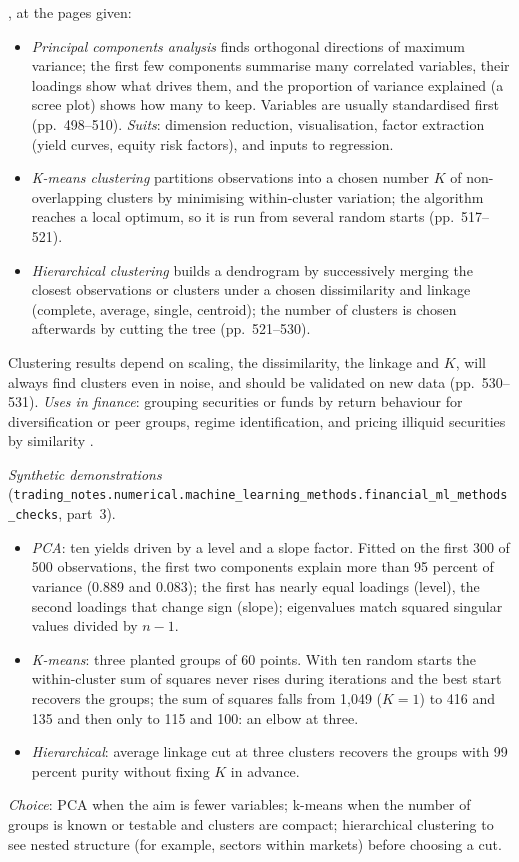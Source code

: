 \begin{qfmethod}\label{meth:unsupervised-algorithm-selection}
 \citep[pp.~498--531]{s6-isl}, at the pages given:
\begin{itemize}
\item \emph{Principal components analysis} finds orthogonal directions of maximum variance; the first few components summarise many correlated variables, their loadings show what drives them, and the proportion of variance explained (a scree plot) shows how many to keep. Variables are usually standardised first (pp.~498--510). \emph{Suits}: dimension reduction, visualisation, factor extraction (yield curves, equity risk factors), and inputs to regression.
\item \emph{K-means clustering} partitions observations into a chosen number $K$ of non-overlapping clusters by minimising within-cluster variation; the algorithm reaches a local optimum, so it is run from several random starts (pp.~517--521).
\item \emph{Hierarchical clustering} builds a dendrogram by successively merging the closest observations or clusters under a chosen dissimilarity and linkage (complete, average, single, centroid); the number of clusters is chosen afterwards by cutting the tree (pp.~521--530).
\end{itemize}
Clustering results depend on scaling, the dissimilarity, the linkage and $K$, will always find clusters even in noise, and should be validated on new data (pp.~530--531). \emph{Uses in finance}: grouping securities or funds by return behaviour for diversification or peer groups, regime identification, and pricing illiquid securities by similarity \citep[p.~5]{fsb-ai-ml-2017}.

 \emph{Synthetic demonstrations} (\nolinkurl{trading_notes.numerical.machine_learning_methods.financial_ml_methods_checks}, part~3).
\begin{itemize}
\item \emph{PCA}: ten yields driven by a level and a slope factor. Fitted on the first 300 of 500 observations, the first two components explain more than 95 percent of variance (0.889 and 0.083); the first has nearly equal loadings (level), the second loadings that change sign (slope); eigenvalues match squared singular values divided by $n-1$.
\item \emph{K-means}: three planted groups of 60 points. With ten random starts the within-cluster sum of squares never rises during iterations and the best start recovers the groups; the sum of squares falls from 1,049 ($K=1$) to 416 and 135 and then only to 115 and 100: an elbow at three.
\item \emph{Hierarchical}: average linkage cut at three clusters recovers the groups with 99 percent purity without fixing $K$ in advance.
\end{itemize}
\emph{Choice}: PCA when the aim is fewer variables; k-means when the number of groups is known or testable and clusters are compact; hierarchical clustering to see nested structure (for example, sectors within markets) before choosing a cut.


\end{qfmethod}
